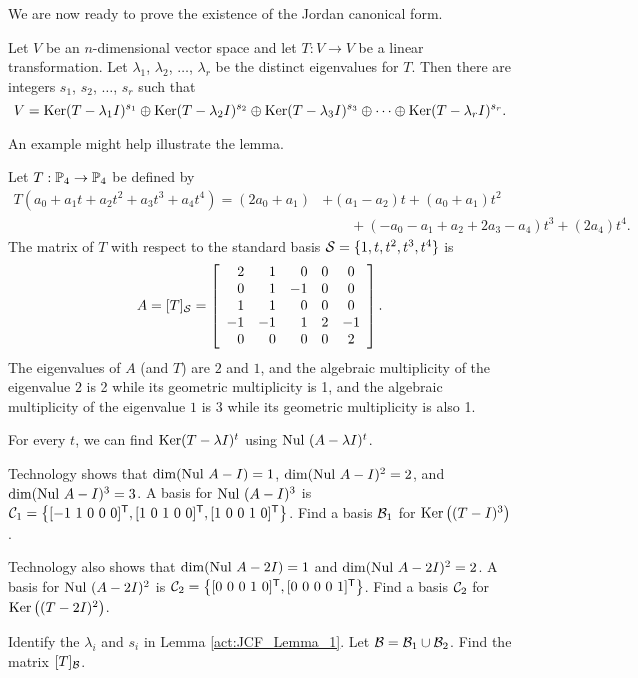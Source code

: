 
We are now ready to prove the existence of the Jordan canonical form.

 \begin{lemma} \label{lem:JCF_1} Let $V$ be an $n$-dimensional vector space and let $T: V \to V$ be a linear transformation. Let $\lambda_1$, $\lambda_2$, $\ldots$, $\lambda_r$ be the distinct eigenvalues for $T$.  Then there are integers $s_1$, $s_2$, $\ldots$, $s_r$ such that 
 \[V = \text{Ker}(T-\lambda_1 I)^{s_1} \oplus \text{Ker}(T-\lambda_2 I)^{s_2} \oplus \text{Ker}(T-\lambda_3 I)^{s_3} \oplus \cdots \oplus \text{Ker}(T-\lambda_r I)^{s_r}.\]
 \end{lemma}
 
An example might help illustrate the lemma. 

\begin{activity} \label{act:JCF_Lemma_1} Let $T:\mathbb{P}_4 \to \mathbb{P}_4$ be defined by 
\begin{align*}
T\left(a_0+a_1t+a_2t^2+a_3t^3+a_4t^4\right) = (2a_0+a_1) &+ (a_1-a_2)t + (a_0+a_1)t^2 \\
	&\qquad + (-a_0-a_1+a_2+2a_3-a_4)t^3 + (2a_4)t^4.
\end{align*}
The matrix of $T$ with respect to the standard basis $\mathcal{S} = \{1,t,t^2,t^3,t^4\}$ is 
\[A = [T]_{\mathcal{S}} = \left[ \begin{array}{rrrcc} 2&1&0&0&0\\0&1&-1&0&0 \\ 1&1&0&0&0 \\ -1&-1&1&2&-1 \\ 0&0&0&0&2 \end{array} \right].\]
The eigenvalues of $A$ (and $T$) are $2$ and $1$, and the algebraic multiplicity of the eigenvalue $2$ is 2 while its geometric multiplicity is 1, and the algebraic multiplicity of the eigenvalue $1$ is 3 while its geometric multiplicity is also 1.  

For every $t$, we can find $\text{Ker}(T-\lambda I)^t$ using $\text{Nul } (A- \lambda I)^t$. 
\ba
\item Technology shows that $\dim(\text{Nul } A-I) = 1$, $\dim(\text{Nul } A-I)^2 = 2$, and $\dim(\text{Nul } A-I)^3 = 3$. A basis for $\text{Nul } (A-I)^3$ is $\mathcal{C}_1 = \left\{ [-1 \ 1 \ 0 \ 0 \ 0]^{\mathsf{T}}, [1 \ 0 \ 1 \ 0 \ 0]^{\mathsf{T}}, [1 \ 0 \ 0 \ 1 \ 0]^{\mathsf{T}}\right\}$. Find a basis $\mathcal{B}_1$ for $\text{Ker}\left((T-I)^3\right)$.

\item Technology also shows that $\dim(\text{Nul } A-2I) = 1$ and $\dim(\text{Nul } A-2I)^2 = 2$. A basis for $\text{Nul } (A-2I)^2$ is $\mathcal{C}_2 = \left\{ [0 \ 0 \ 0 \ 1 \ 0]^{\mathsf{T}}, [0 \ 0 \ 0 \ 0 \ 1]^{\mathsf{T}}\right\}$. Find a basis $\mathcal{C}_2$ for $\text{Ker}\left((T-2I)^2\right)$.

\item Identify the $\lambda_i$ and $s_i$ in Lemma \ref{act:JCF_Lemma_1}. Let $\mathcal{B} = \mathcal{B}_1 \cup \mathcal{B}_2$. Find the matrix $[T]_{\mathcal{B}}$. 

\ea

\end{activity}

